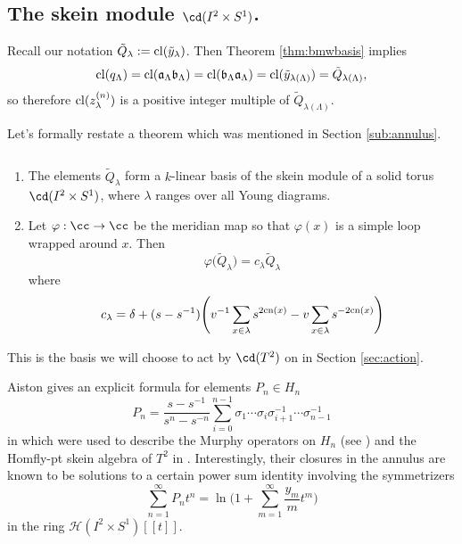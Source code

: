 \subsection{\textbf{The skein module $\cd(I^2 \times S^1)$.}} \label{sec:annulus}

\begin{remark} \label{rmk:qclosure}
Recall our notation $\tilde{Q}_\lambda := \mathrm{cl}(\tilde{y}_\lambda)$. Then Theorem \ref{thm:bmwbasis} implies
\[
    \mathrm{cl}(q_\Lambda) = \mathrm{cl}(\mathfrak{a}_\Lambda \mathfrak{b}_\Lambda) = \mathrm{cl}(\mathfrak{b}_\Lambda \mathfrak{a}_\Lambda) = \mathrm{cl}(\tilde{y}_{\lambda(\Lambda)}) = \tilde{Q}_{\lambda(\Lambda)},
\]
so therefore $\mathrm{cl}(z_\lambda^{(n)})$ is a positive integer multiple of $\tilde{Q}_{\lambda(\Lambda)}$.
\end{remark}

Let's formally restate a theorem which was mentioned in Section \ref{sub:annulus}.

\begin{theorem}\label{thm:ann_basis} 
$\,$
\begin{enumerate}
    \item The elements $\tilde{Q}_\lambda$ form a $k$-linear basis of the skein module of a solid torus $\cd(I^2 \times S^1)$, where $\lambda$ ranges over all Young diagrams. 
    \item Let $\varphi: \cc \to \cc$ be the meridian map so that $\varphi(x)$ is a simple loop wrapped around $x$. Then
    \[
        \varphi \big( \tilde{Q}_\lambda \big) = c_\lambda \tilde{Q}_\lambda
    \]
    where 
        \[c_\lambda = \delta + (s - s^{-1}) \Bigg( v^{-1}\sum_{x \in \lambda} s^{2\mathrm{cn}(x)} - v\sum_{x \in \lambda} s^{-2\mathrm{cn}(x)} \Bigg)
    \]
\end{enumerate}
\end{theorem}

This is the basis we will choose to act by $\cd(T^2)$ on in Section \ref{sec:action}. 

Aiston gives an explicit formula for elements $P_n \in H_n$  
\[
    P_n = \frac{s-s^{-1}}{s^n-s^{-n}} \sum_{i=0}^{n-1} \sigma_1 \cdots \sigma_i \sigma_{i+1}^{-1} \cdots \sigma_{n-1}^{-1}
\]
in \cite{Ais97} which were used to describe the Murphy operators on $H_n$ (see \cite{Mor01}) and the Homfly-pt skein algebra of $T^2$ in \cite{MS17}.
Interestingly, their closures in the annulus are known to be solutions to a certain power sum identity involving the symmetrizers
\[
    \sum_{n=1}^\infty P_n t^n = \ln \Big( 1 + \sum_{m=1}^\infty \frac{y_m}{m} t^m \Big)
\]
in the ring $\mathcal{H}(I^2 \times S^1)[[t]]$.

